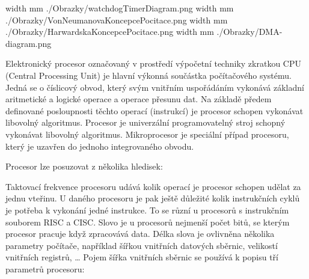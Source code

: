 %
%
%



%

\pdfximage width \the\SirkaOdstavce mm {./Obrazky/watchdogTimerDiagram.png}
\pdfximage width \the\SirkaOdstavce mm {./Obrazky/VonNeumanovaKoncepcePocitace.png}
\pdfximage width \the\SirkaOdstavce mm {./Obrazky/HarwardskaKoncepcePocitace.png}
\pdfximage width \the\SirkaOdstavce mm {./Obrazky/DMA-diagram.png}


\Obsah


Elektronický procesor označovaný v prostředí výpočetní techniky zkratkou CPU (Central Processing Unit) je hlavní výkonná součástka počítačového systému. Jedná se o číslicový obvod, který svým vnitřním uspořádáním vykonává základní aritmetické a logické operace a operace přesunu dat. Na základě předem definované posloupnosti těchto operací (instrukcí) je procesor schopen vykonávat libovolný algoritmus. Procesor je univerzální programovatelný stroj schopný vykonávat libovolný algoritmus. Mikroprocesor je speciální případ procesoru, který je uzavřen do jednoho integrovaného obvodu.

Procesor lze posuzovat z několika hledisek:

\vskip 4mm
\vskip 4mm

Taktovací frekvence procesoru udává kolik operací je procesor schopen udělat za jednu vteřinu. U daného procesoru je pak ještě důležité kolik instrukčních cyklů je potřeba k vykonání jedné instrukce. To se různí u procesorů s instrukčním souborem RISC a CISC. Slovo je u procesorů nejmenší počet bitů, se kterým procesor pracuje když zpracovává data. Délka slova je ovlivněna několika parametry počítače, například šířkou vnitřních datových sběrnic, velikostí vnitřních registrů, … 
Pojem šířka vnitřních sběrnic se používá k popisu tří parametrů procesoru:

\vskip 4mm
\vskip 4mm

